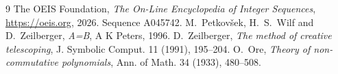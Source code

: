 \documentclass[11pt,a4paper]{article}
\theoremstyle{plain}
\theoremstyle{definition}
\begin{document}
\begin{thebibliography}{9}
 The OEIS Foundation, \emph{The On-Line Encyclopedia of Integer Sequences},
\url{https://oeis.org}, 2026. Sequence A045742.
 M.~Petkov\v{s}ek, H.~S.~Wilf and D.~Zeilberger, \emph{A=B}, A K Peters,
1996.
 D.~Zeilberger, \emph{The method of creative telescoping}, J. Symbolic
Comput. 11 (1991), 195--204.
 O.~Ore, \emph{Theory of non-commutative polynomials}, Ann. of Math. 34
(1933), 480--508.
\end{thebibliography}
\end{document}
